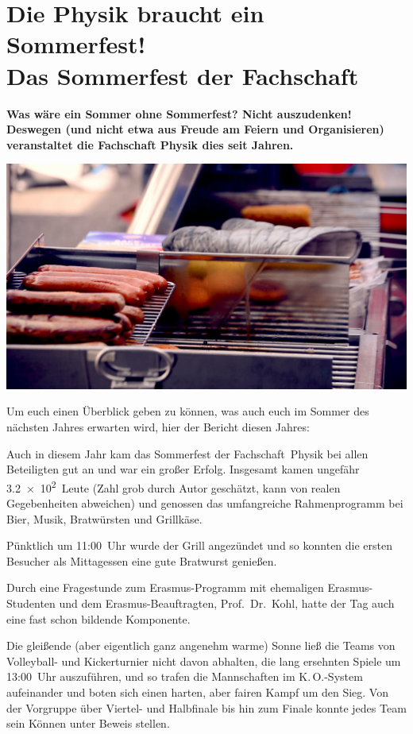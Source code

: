 \section[Das Sommerfest der Fachschaft]{Die Physik braucht ein Sommerfest!\\Das Sommerfest der Fachschaft}
\begin{multicols*}{2}

\textbf{Was wäre ein Sommer ohne Sommerfest?
	Nicht auszudenken!
	Deswegen (und nicht etwa aus Freude am Feiern und Organisieren) veranstaltet die Fachschaft Physik dies seit Jahren.}

\includegraphics[width=\columnwidth]{res/sommerfest_grill.png}

Um euch einen Überblick geben zu können, was auch euch im Sommer des nächsten Jahres erwarten wird, hier der Bericht diesen Jahres:

Auch in diesem Jahr kam das Sommerfest der Fachschaft~Physik bei allen Beteiligten gut an und war ein großer Erfolg.
Insgesamt kamen ungefähr \num{3,2e2}~Leute (Zahl grob durch Autor geschätzt, kann von realen Gegebenheiten abweichen) und genossen das umfangreiche Rahmenprogramm bei Bier, Musik, Bratwürsten und Grillkäse.

Pünktlich um 11:00~Uhr wurde der Grill angezündet und so konnten die ersten Besucher als Mittagessen eine gute Bratwurst genießen.

Durch eine Fragestunde zum Erasmus-Programm mit ehemaligen Erasmus-Studenten und dem Erasmus-Beauftragten, Prof.\ Dr.\ Kohl, hatte der Tag auch eine fast schon bildende Komponente.

Die gleißende (aber eigentlich ganz angenehm warme) Sonne ließ die Teams von Volleyball- und Kickerturnier nicht davon abhalten, die lang ersehnten Spiele um 13:00~Uhr auszuführen, und so trafen die Mannschaften im K.\,O.-System aufeinander und boten sich einen harten, aber fairen Kampf um den Sieg.
Von der Vorgruppe über Viertel- und Halbfinale bis hin zum Finale konnte jedes Team sein Können unter Beweis stellen.


\end{multicols*}
